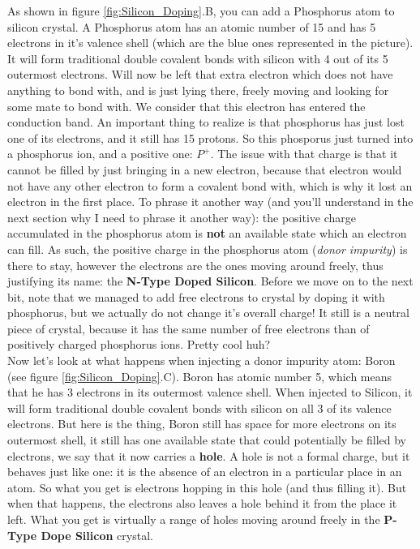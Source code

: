 As shown in figure \ref{fig:Silicon_Doping}.B, you can add a Phosphorus atom to silicon crystal. A Phosphorus atom has an atomic number of 15 and has 5 electrons in it's valence shell (which are the blue ones represented in the picture). It will form traditional double covalent bonds with silicon with 4 out of its 5 outermost electrons. Will now be left that extra electron which does not have anything to bond with, and is just lying there, freely moving and looking for some mate to bond with. We consider that this electron has entered the conduction band. An important thing to realize is that phosphorus has just lost one of its electrons, and it still has 15 protons. So this phosporus just turned into a phosphorus ion, and a positive one: $P^+$. The issue with that charge is that it cannot be filled by just bringing in a new electron, because that electron would not have any other electron to form a covalent bond with, which is why it lost an electron in the first place. To phrase it another way (and you'll understand in the next section why I need to phrase it another way): the positive charge accumulated in the phosphorus atom is \textbf{not} an available state which an electron can fill. As such, the positive charge in the phosphorus atom (\textit{donor impurity}) is there to stay, however the electrons are the ones moving around freely, thus justifying its name: the \textbf{N-Type Doped Silicon}. Before we move on to the next bit, note that we managed to add free electrons to crystal by doping it with phosphorus, but we actually do not change it's overall charge! It still is a neutral piece of crystal, because it has the same number of free electrons than of positively charged phosphorus ions. Pretty cool huh? \\

Now let's look at what happens when injecting a donor impurity atom: Boron (see figure \ref{fig:Silicon_Doping}.C). Boron has atomic number 5, which means that he has 3 electrons in its outermost valence shell. When injected to Silicon, it will form traditional double covalent bonds with silicon on all 3 of its valence electrons. But here is the thing, Boron still has space for more electrons on its outermost shell, it still has one available state that could potentially be filled by electrons, we say that it now carries a \textbf{hole}. A hole is not a formal charge, but it behaves just like one: it is the absence of an electron in a particular place in an atom.  So what you get is electrons hopping in this hole (and thus filling it). But when that happens, the electrons also leaves a hole behind it from the place it left. What you get is virtually a range of holes moving around freely in the \textbf{P-Type Dope Silicon} crystal.  

